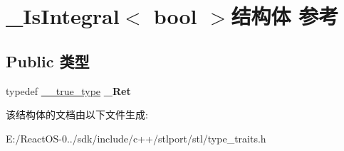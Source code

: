 \hypertarget{struct___is_integral_3_01bool_01_4}{}\section{\+\_\+\+Is\+Integral$<$ bool $>$结构体 参考}
\label{struct___is_integral_3_01bool_01_4}
\subsection*{Public 类型}
\begin{DoxyCompactItemize}
\item 
\mbox{\label{struct___is_integral_3_01bool_01_4_a331107d440fa35ea212921120ad19fc5}} 
typedef \hyperlink{struct____true__type}{\+\_\+\+\_\+true\+\_\+type} {\bfseries \+\_\+\+Ret}
\end{DoxyCompactItemize}


该结构体的文档由以下文件生成\+:\begin{DoxyCompactItemize}
\item 
E\+:/\+React\+O\+S-\/0../sdk/include/c++/stlport/stl/type\+\_\+traits.\+h\end{DoxyCompactItemize}

